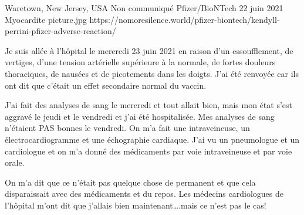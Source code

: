 {Waretown, New Jersey, USA}
{Non communiqué}
{Pfizer/BioNTech }
{22 juin 2021}
{Myocardite}
{picture.jpg}
{https://nomoresilence.world/pfizer-biontech/kendyll-perrini-pfizer-adverse-reaction/}
{

Je suis allée à l'hôpital le mercredi 23 juin 2021 en raison d'un essoufflement,
de vertiges, d'une tension artérielle supérieure à la normale, de fortes
douleurs thoraciques, de nausées et de picotements dans les doigts. J'ai été
renvoyée car ils ont dit que c'était un effet secondaire normal du vaccin.

J'ai fait des analyses de sang le mercredi et tout allait bien, mais mon état
s'est aggravé le jeudi et le vendredi et j'ai été hospitalisée. Mes analyses de
sang n'étaient PAS bonnes le vendredi. On m'a fait une intraveineuse, un
électrocardiogramme et une échographie cardiaque. J'ai vu un pneumologue et un
cardiologue et on m'a donné des médicaments par voie intraveineuse et par voie
orale.

On m'a dit que ce n'était pas quelque chose de permanent et que cela
disparaissait avec des médicaments et du repos. Les médecins cardiologues de
l'hôpital m'ont dit que j'allais bien maintenant….mais ce n'est pas le cas!

}
